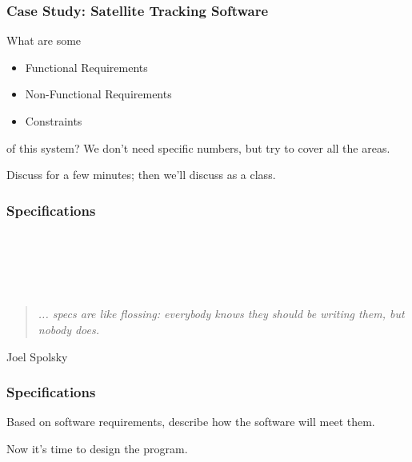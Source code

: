 \begin{frame}
	\frametitle{Case Study: Satellite Tracking Software}
	
	\begin{changemargin}{1cm}
 	What are some 
	\begin{itemize}
		\item Functional Requirements
		\item Non-Functional Requirements
		\item Constraints
	\end{itemize}
	
	of this system? We don't need specific numbers, but try to cover all the areas.
	
	Discuss for a few minutes; then we'll discuss as a class.
	\end{changemargin}
			
			
\end{frame}


\begin{frame}
\frametitle{Specifications}

~\\~\\~\\~\\
\begin{quote}
	\textit{... specs are like flossing: everybody knows they should be writing them, but nobody does.}
\end{quote}
\hfill Joel Spolsky 

\end{frame}

\begin{frame}
\frametitle{Specifications}
	\begin{changemargin}{1cm}
	Based on software requirements, describe how the software will meet them.
	
	Now it's time to design the program. 
	
	\end{changemargin}
\end{frame}


